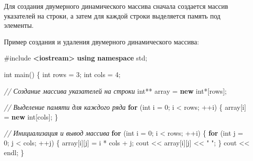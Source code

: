 \documentclass[
]{article}
\newenvironment{Shaded}{}{}
\newcommand{\CommentTok}[1]{\textcolor[rgb]{0.38,0.63,0.69}{\textit{#1}}}
\newcommand{\ControlFlowTok}[1]{\textcolor[rgb]{0.00,0.44,0.13}{\textbf{#1}}}
\newcommand{\DataTypeTok}[1]{\textcolor[rgb]{0.56,0.13,0.00}{#1}}
\newcommand{\DecValTok}[1]{\textcolor[rgb]{0.25,0.63,0.44}{#1}}
\newcommand{\ImportTok}[1]{\textcolor[rgb]{0.00,0.50,0.00}{\textbf{#1}}}
\newcommand{\KeywordTok}[1]{\textcolor[rgb]{0.00,0.44,0.13}{\textbf{#1}}}
\newcommand{\NormalTok}[1]{#1}
\newcommand{\OperatorTok}[1]{\textcolor[rgb]{0.40,0.40,0.40}{#1}}
\newcommand{\PreprocessorTok}[1]{\textcolor[rgb]{0.74,0.48,0.00}{#1}}
\newcommand{\StringTok}[1]{\textcolor[rgb]{0.25,0.44,0.63}{#1}}
\begin{document}
Для создания двумерного динамического массива сначала создается массив
указателей на строки, а затем для каждой строки выделяется память под
элементы.

Пример создания и удаления двумерного динамического массива:

\begin{Shaded}
\begin{Highlighting}[]
\PreprocessorTok{\#include }\ImportTok{\textless{}iostream\textgreater{}}
\KeywordTok{using} \KeywordTok{namespace}\NormalTok{ std}\OperatorTok{;}

\DataTypeTok{int}\NormalTok{ main}\OperatorTok{()} \OperatorTok{\{}
    \DataTypeTok{int}\NormalTok{ rows }\OperatorTok{=} \DecValTok{3}\OperatorTok{;}
    \DataTypeTok{int}\NormalTok{ cols }\OperatorTok{=} \DecValTok{4}\OperatorTok{;}

    \CommentTok{// Создание массива указателей на строки}
    \DataTypeTok{int}\OperatorTok{**}\NormalTok{ array }\OperatorTok{=} \KeywordTok{new} \DataTypeTok{int}\OperatorTok{*[}\NormalTok{rows}\OperatorTok{];}

    \CommentTok{// Выделение памяти для каждого ряда}
    \ControlFlowTok{for} \OperatorTok{(}\DataTypeTok{int}\NormalTok{ i }\OperatorTok{=} \DecValTok{0}\OperatorTok{;}\NormalTok{ i }\OperatorTok{\textless{}}\NormalTok{ rows}\OperatorTok{;} \OperatorTok{++}\NormalTok{i}\OperatorTok{)} \OperatorTok{\{}
\NormalTok{        array}\OperatorTok{[}\NormalTok{i}\OperatorTok{]} \OperatorTok{=} \KeywordTok{new} \DataTypeTok{int}\OperatorTok{[}\NormalTok{cols}\OperatorTok{];}
    \OperatorTok{\}}

    \CommentTok{// Инициализация и вывод массива}
    \ControlFlowTok{for} \OperatorTok{(}\DataTypeTok{int}\NormalTok{ i }\OperatorTok{=} \DecValTok{0}\OperatorTok{;}\NormalTok{ i }\OperatorTok{\textless{}}\NormalTok{ rows}\OperatorTok{;} \OperatorTok{++}\NormalTok{i}\OperatorTok{)} \OperatorTok{\{}
        \ControlFlowTok{for} \OperatorTok{(}\DataTypeTok{int}\NormalTok{ j }\OperatorTok{=} \DecValTok{0}\OperatorTok{;}\NormalTok{ j }\OperatorTok{\textless{}}\NormalTok{ cols}\OperatorTok{;} \OperatorTok{++}\NormalTok{j}\OperatorTok{)} \OperatorTok{\{}
\NormalTok{            array}\OperatorTok{[}\NormalTok{i}\OperatorTok{][}\NormalTok{j}\OperatorTok{]} \OperatorTok{=}\NormalTok{ i }\OperatorTok{*}\NormalTok{ cols }\OperatorTok{+}\NormalTok{ j}\OperatorTok{;}
\NormalTok{            cout }\OperatorTok{\textless{}\textless{}}\NormalTok{ array}\OperatorTok{[}\NormalTok{i}\OperatorTok{][}\NormalTok{j}\OperatorTok{]} \OperatorTok{\textless{}\textless{}} \StringTok{" "}\OperatorTok{;}
        \OperatorTok{\}}
\NormalTok{        cout }\OperatorTok{\textless{}\textless{}}\NormalTok{ endl}\OperatorTok{;}
    \OperatorTok{\}}


\end{Highlighting}
\end{Shaded}
\end{document}
